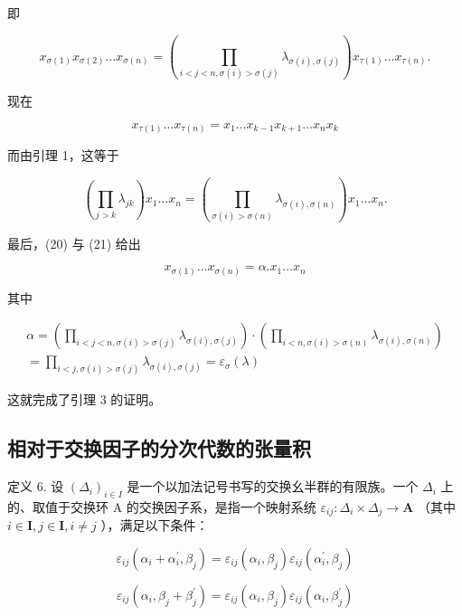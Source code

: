 即

\[
x _ {\sigma (1)} x _ {\sigma (2)} \dots x _ {\sigma (n)} = \left(\prod_ {i <   j <   n, \sigma (i) > \sigma (j)} \lambda_ {\sigma (i), \sigma (j)}\right) x _ {\tau (1)} \dots x _ {\tau (n)}.\tag{20}
\]

现在

\[
x _ {\tau (1)} \dots x _ {\tau (n)} = x _ {1} \dots x _ {k - 1} x _ {k + 1} \dots x _ {n} x _ {k}
\]

而由引理 1，这等于

\[
\left(\prod_ {j > k} \lambda_ {j k}\right) x _ {1} \dots x _ {n} = \left(\prod_ {\sigma (i) > \sigma (n)} \lambda_ {\sigma (i), \sigma (n)}\right) x _ {1} \dots x _ {n}.\tag{21}
\]

最后，(20) 与 (21) 给出

\[
x _ {\sigma (1)} \dots x _ {\sigma (n)} = \alpha . x _ {1} \dots x _ {n}
\]

其中

\[
\begin{array}{l} \alpha = \left(\prod_ {i <   j <   n, \sigma (i) > \sigma (j)} \lambda_ {\sigma (i), \sigma (j)}\right) \cdot \left(\prod_ {i <   n, \sigma (i) > \sigma (n)} \lambda_ {\sigma (i), \sigma (n)}\right) \\ = \prod_ {i <   j, \sigma (i) > \sigma (j)} \lambda_ {\sigma (i), \sigma (j)} = \varepsilon_ {\sigma} (\lambda) \end{array}
\]

这就完成了引理 3 的证明。

\subsection{相对于交换因子的分次代数的张量积}

定义 6. 设 \((\Delta_{i})_{i\in I}\) 是一个以加法记号书写的交换幺半群的有限族。一个 \(\Delta_{i}\) 上的、取值于交换环 A 的交换因子系，是指一个映射系统 \(\varepsilon_{ij}:\Delta_i\times \Delta_j\to \mathbf{A}\) （其中 \(i\in \mathbf{I}, j\in \mathbf{I}, i\neq j\) ），满足以下条件：

\[
\varepsilon_ {i j} \left(\alpha_ {i} + \alpha_ {i} ^ {\prime}, \beta_ {j}\right) = \varepsilon_ {i j} \left(\alpha_ {i}, \beta_ {j}\right) \varepsilon_ {i j} \left(\alpha_ {i} ^ {\prime}, \beta_ {j}\right)\tag{22}
\]

\[
\varepsilon_ {i j} \left(\alpha_ {i}, \beta_ {j} + \beta_ {j} ^ {\prime}\right) = \varepsilon_ {i j} \left(\alpha_ {i}, \beta_ {j}\right) \varepsilon_ {i j} \left(\alpha_ {i}, \beta_ {j} ^ {\prime}\right)\tag{23}
\]

